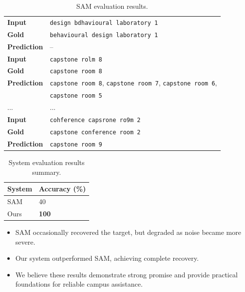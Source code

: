 \documentclass[aspectratio=169,notheorems,10pt]{beamer}
\theoremstyle{definition}
\begin{document}
\begin{frame}
\begin{table}[H]
	\centering
	\begin{tabularx}{\linewidth}{lX}
		\toprule
		\textbf{Input} & \texttt{design bdhavioural laboratory 1} \\
		\textbf{Gold} & \texttt{behavioural design laboratory 1} \\
		\textbf{Prediction} & -- \\
		\midrule
		\textbf{Input} & \texttt{capstone rolm 8} \\
		\textbf{Gold} & \texttt{capstone room 8} \\
		\textbf{Prediction} & \texttt{capstone room 8}, \texttt{capstone room 7}, \texttt{capstone room 6}, \\
		& \texttt{capstone room 5} \\
		\midrule
		... & ... \\
		\midrule
		\textbf{Input} & \texttt{cohference capsrone ro9m 2} \\
		\textbf{Gold} & \texttt{capstone conference room 2} \\
		\textbf{Prediction} & \texttt{capstone room 9} \\
		\bottomrule
	\end{tabularx}
	\caption{SAM evaluation results.}
\end{table}
\end{frame}

\begin{frame}
\begin{table}[H]
	\centering
	\begin{tabular}{ll}
		\toprule
		\textbf{System} & \textbf{Accuracy} (\%) \\
		\midrule
		SAM & 40 \\
		Ours & \textbf{100} \\
		\bottomrule
	\end{tabular}
	\caption{System evaluation results summary.}
\end{table}
\begin{itemize}
	\item SAM occasionally recovered the target, but degraded as noise became more severe.
	\item Our system outperformed SAM, achieving complete recovery.
	\item We believe these results demonstrate strong promise and provide practical foundations for reliable campus assistance.
\end{itemize}
\end{frame}
\end{document}
